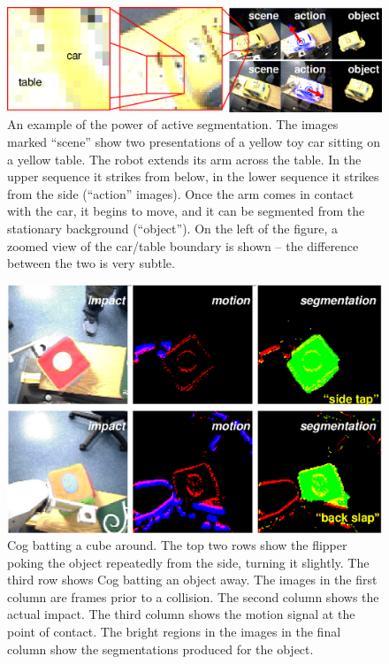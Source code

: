 \begin{figure}[tbh]
  \centerline{\includegraphics[width=\textwidth]{fig-double-yellow}}
  \label{fig:poking-zoom}
  \caption{
%
An example of the power of active segmentation.  The images
marked ``scene'' show two presentations of a yellow toy car
sitting on a yellow table.  The robot extends its arm across
the table.  In the upper sequence it strikes from below, in the
lower sequence it strikes from the side (``action'' images).
Once the arm comes in contact with the car, it begins to move,
and it can be segmented from the stationary background (``object'').
On the left of the figure, a zoomed view of the car/table
boundary is shown -- the difference between the two is very subtle.
%
} 
\end{figure}


\ifverbose
%
\begin{figure}[tb]
\begin{center}
\includegraphics[width=12cm]{segmentation-detail.eps}
\caption{ 
\label{fig:poking-segmentation}
%
Cog batting a cube around.  The top two rows show the flipper poking
the object repeatedly from the side, turning it slightly.  The third
row shows Cog batting an object away.  The images in the first column
are frames prior to a collision.  The second column shows the actual
impact.  The third column shows the motion signal at the point of
contact.  The bright regions in the images in the final column show
the segmentations produced for the object. 
%
}
\end{center}
\end{figure}
%
\fi

